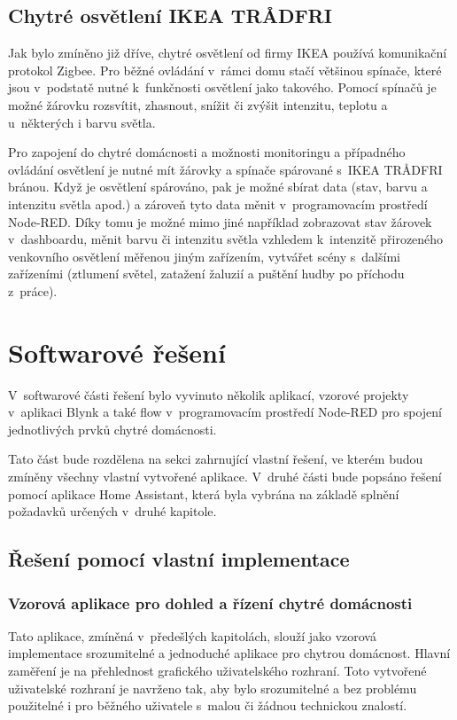 \subsection*{Chytré osvětlení IKEA TRÅDFRI}
Jak bylo zmíněno již dříve, chytré osvětlení od firmy IKEA používá komunikační protokol Zigbee. Pro běžné ovládání v~rámci domu stačí většinou spínače, které jsou v~podstatě nutné k~funkčnosti osvětlení jako takového. Pomocí spínačů je možné žárovku rozsvítit, zhasnout, snížit či zvýšit intenzitu, teplotu a u~některých i barvu světla.

Pro zapojení do chytré domácnosti a možnosti monitoringu a případného ovládání osvětlení je nutné mít žárovky a spínače spárované s~IKEA TRÅDFRI bránou.
Když je osvětlení spárováno, pak je možné sbírat data (stav, barvu a intenzitu světla apod.) a zároveň tyto data měnit v~programovacím prostředí Node-RED. Díky tomu je možné mimo jiné například zobrazovat stav žárovek v~dashboardu, měnit barvu či intenzitu světla vzhledem k~intenzitě přirozeného venkovního osvětlení měřenou jiným zařízením, vytvářet scény s~dalšími zařízeními (ztlumení světel, zatažení žaluzií a puštění hudby po příchodu z~práce).

\section{Softwarové řešení}
V~softwarové části řešení bylo vyvinuto několik aplikací, vzorové projekty v~aplikaci Blynk a také flow v~programovacím prostředí Node-RED pro spojení jednotlivých prvků chytré domácnosti.

Tato část bude rozdělena na sekci zahrnující vlastní řešení, ve kterém budou zmíněny všechny vlastní vytvořené aplikace.
V~druhé části bude popsáno řešení pomocí aplikace Home Assistant, která byla vybrána na základě splnění požadavků určených v~druhé kapitole.

\subsection*{Řešení pomocí vlastní implementace} \label{own-implementation}
\subsubsection*{Vzorová aplikace pro dohled a řízení chytré domácnosti}
Tato aplikace, zmíněná v~předešlých kapitolách, slouží jako vzorová implementace srozumitelné a jednoduché aplikace pro chytrou domácnost. Hlavní zaměření je na přehlednost grafického uživatelského rozhraní. Toto vytvořené uživatelské rozhraní je navrženo tak, aby bylo srozumitelné a bez problému použitelné i pro běžného uživatele s~malou či žádnou technickou znalostí.

